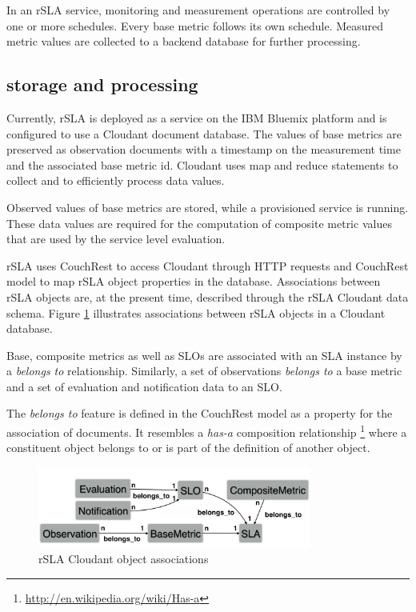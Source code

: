 In an rSLA service, monitoring and measurement operations are controlled by one or more schedules. Every base metric follows its own schedule. Measured metric values are collected to a backend database for further processing. 
\subsection{storage and processing}
Currently, rSLA is deployed as a service on the IBM Bluemix platform \cite{bluemix} and is configured to use a Cloudant \cite{cloudant} document database. The values of base metrics are preserved as observation documents with a timestamp on the measurement time and the associated base metric id. Cloudant uses map and reduce statements to collect and to efficiently process data values. 

Observed values of base metrics are stored, while a provisioned service is running. These data values are required for the computation of composite metric values that are used by the service level evaluation. 

rSLA uses CouchRest \cite{couchrest} to access Cloudant through HTTP requests and CouchRest model to map rSLA object properties in the database. Associations between rSLA objects are, at the present time, described through the rSLA Cloudant data schema. Figure \ref{schema} illustrates  associations between rSLA objects in a Cloudant database.

Base, composite metrics as well as SLOs are associated with an SLA instance by a \textit{belongs to} relationship. Similarly, a set of observations \textit{belongs to} a base metric and a set of evaluation and notification data to an SLO. 

The \textit{belongs to} feature is defined in the CouchRest model as a property for the association of documents. It resembles a \textit{has-a} composition relationship \footnote{\url{http://en.wikipedia.org/wiki/Has-a}} where a constituent object belongs to or is part of the definition of another object.

\begin{figure}
\centering
\includegraphics[width=0.8\textwidth]{pics/schema}
\caption{\label{schema} rSLA Cloudant object associations}
\end{figure}

